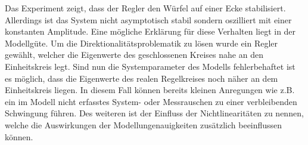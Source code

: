 Das Experiment zeigt, dass der Regler den Würfel auf einer Ecke stabilisiert. Allerdings ist das System nicht asymptotisch stabil sondern oszilliert mit einer konstanten Amplitude. Eine mögliche Erklärung für diese Verhalten liegt in der Modellgüte. Um die Direktionalitätsproblematik zu lösen wurde ein Regler gewählt, welcher die Eigenwerte des geschlossenen Kreises nahe an den Einheitskreis legt. Sind nun die Systemparameter des Modells fehlerbehaftet ist es möglich, dass die Eigenwerte des realen Regelkreises noch näher an dem Einheitskreis liegen. In diesem Fall können bereits kleinen Anregungen wie z.B. ein im Modell nicht erfasstes System- oder Messrauschen zu einer verbleibenden Schwingung führen. Des weiteren ist der Einfluss der Nichtlinearitäten zu nennen, welche die Auswirkungen der Modellungenauigkeiten zusätzlich beeinflussen können. 

